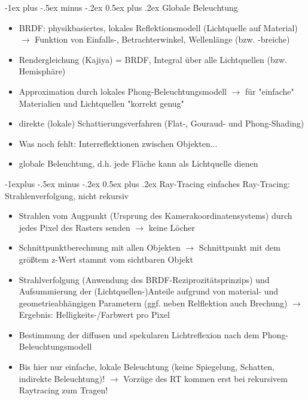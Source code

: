 \documentclass[10pt,landscape]{article}
\makeatletter
\renewcommand{\section}{\@startsection{section}{1}{0mm}%
                                {-1ex plus -.5ex minus -.2ex}%
                                {0.5ex plus .2ex}%
                                {\normalfont\large\bfseries}}
\renewcommand{\subsection}{\@startsection{subsection}{2}{0mm}%
                                {-1explus -.5ex minus -.2ex}%
                                {0.5ex plus .2ex}%
                                {\normalfont\normalsize\bfseries}}
\makeatother
\begin{document}
\begin{multicols}{3}
\section{Globale Beleuchtung}
\begin{itemize}
  \item BRDF: physikbasiertes, lokales Reflektionsmodell (Lichtquelle auf Material) $\rightarrow$ Funktion von Einfalls-, Betrachterwinkel, Wellenlänge (bzw. -breiche)
  \item Rendergleichung (Kajiya) = BRDF, Integral über alle Lichtquellen (bzw. Hemisphäre)
  \item Approximation durch lokales Phong-Beleuchtungsmodell $\rightarrow$ für "einfache" Materialien und Lichtquellen "korrekt genug"
  \item direkte (lokale) Schattierungsverfahren (Flat-, Gouraud- und Phong-Shading)
  \item Was noch fehlt: Interreflektionen zwischen Objekten...
  \item globale Beleuchtung, d.h. jede Fläche kann als Lichtquelle dienen
\end{itemize}

\subsection{ Ray-Tracing}
einfaches Ray-Tracing: Strahlenverfolgung, nicht rekursiv
\begin{itemize}
  \item Strahlen vom Augpunkt (Ursprung des Kamerakoordinatensystems) durch jedes Pixel des Rasters senden $\rightarrow$ keine Löcher
  \item Schnittpunktberechnung mit allen Objekten $\rightarrow$ Schnittpunkt mit dem größtem z-Wert stammt vom sichtbaren Objekt
  \item Strahlverfolgung (Anwendung des BRDF-Reziprozitätsprinzips) und Aufsummierung der (Lichtquellen-)Anteile aufgrund von material- und geometrieabhängigen Parametern (ggf. neben Relflektion auch Brechung) $\rightarrow$ Ergebnis: Helligkeits-/Farbwert pro Pixel
  \item Bestimmung der diffusen und spekularen Lichtreflexion nach dem Phong-Beleuchtungsmodell
  \item Bis hier nur einfache, lokale Beleuchtung (keine Spiegelung, Schatten, indirekte Beleuchtung)! $\rightarrow$ Vorzüge des RT kommen erst bei rekursivem Raytracing zum Tragen!
\end{itemize}



\end{multicols}
\end{document}
